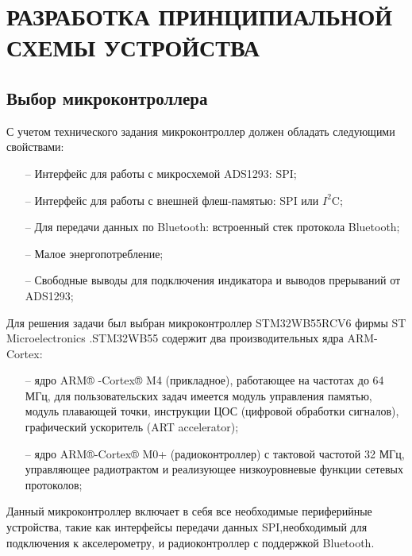 \begin{sloppypar} %
\newpage %
\section{РАЗРАБОТКА ПРИНЦИПИАЛЬНОЙ СХЕМЫ УСТРОЙСТВА} %

 


\subsection{Выбор микроконтроллера}
С учетом технического задания микроконтроллер должен обладать следующими свойствами:
\begin{onehalfspace}
	\begin{itemize}
		\item[--]Интерфейс для работы с микросхемой ADS1293: SPI;
		\item[--]Интерфейс для работы с внешней флеш-памятью: SPI или $I^2$C;
		\item[--]Для передачи данных по Bluetooth: встроенный стек протокола Bluetooth;
		\item[--]Малое энергопотребление;
		\item[--]Свободные выводы для подключения индикатора и выводов прерываний от ADS1293;
	\end{itemize}
\end{onehalfspace}

Для решения задачи был выбран микроконтроллер STM32WB55RCV6 фирмы ST Microelectronics \cite {STM}.STM32WB55 содержит два производительных ядра ARM-Cortex:
\begin{onehalfspace}
	\begin{itemize}
		\item[--] ядро ARM® -Cortex® M4 (прикладное), работающее на частотах до 64 МГц, для пользовательских задач имеется модуль управления памятью, модуль плавающей точки, инструкции ЦОС (цифровой обработки сигналов), графический ускоритель (ART accelerator);
		\item[--] ядро ARM®-Cortex® M0+ (радиоконтроллер) с тактовой частотой 32 МГц, управляющее радиотрактом и реализующее низкоуровневые функции сетевых протоколов;
	\end{itemize}
\end{onehalfspace}

Данный микроконтроллер включает в себя все необходимые периферийные устройства, такие как интерфейсы передачи данных SPI,необходимый для подключения к акселерометру, и радиоконтроллер с поддержкой Bluetooth.


\end{sloppypar}
